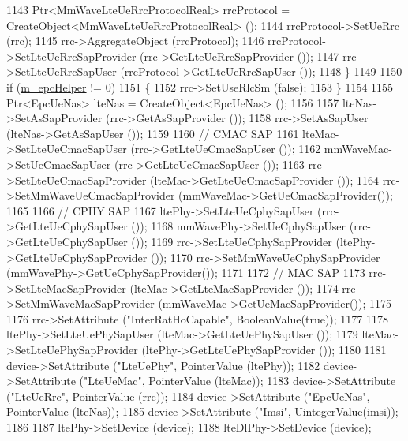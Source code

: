 \begin{DoxyCode}
1143                 Ptr<MmWaveLteUeRrcProtocolReal> rrcProtocol = CreateObject<MmWaveLteUeRrcProtocolReal> ();
1144                 rrcProtocol->SetUeRrc (rrc);
1145                 rrc->AggregateObject (rrcProtocol);
1146                 rrcProtocol->SetLteUeRrcSapProvider (rrc->GetLteUeRrcSapProvider ());
1147                 rrc->SetLteUeRrcSapUser (rrcProtocol->GetLteUeRrcSapUser ());
1148         \}
1149 
1150         \textcolor{keywordflow}{if} (\hyperlink{classns3_1_1MmWaveHelper_a03b33f9a2480a4cdd8ffe697ccc08e9e}{m\_epcHelper} != 0)
1151         \{
1152                 rrc->SetUseRlcSm (\textcolor{keyword}{false});
1153         \}
1154 
1155         Ptr<EpcUeNas> lteNas = CreateObject<EpcUeNas> ();
1156 
1157         lteNas->SetAsSapProvider (rrc->GetAsSapProvider ());
1158         rrc->SetAsSapUser (lteNas->GetAsSapUser ());
1159 
1160         \textcolor{comment}{// CMAC SAP}
1161         lteMac->SetLteUeCmacSapUser (rrc->GetLteUeCmacSapUser ());
1162         mmWaveMac->SetUeCmacSapUser (rrc->GetLteUeCmacSapUser ());
1163         rrc->SetLteUeCmacSapProvider (lteMac->GetLteUeCmacSapProvider ());
1164         rrc->SetMmWaveUeCmacSapProvider (mmWaveMac->GetUeCmacSapProvider());
1165 
1166         \textcolor{comment}{// CPHY SAP}
1167         ltePhy->SetLteUeCphySapUser (rrc->GetLteUeCphySapUser ());
1168         mmWavePhy->SetUeCphySapUser (rrc->GetLteUeCphySapUser ());
1169         rrc->SetLteUeCphySapProvider (ltePhy->GetLteUeCphySapProvider ());
1170         rrc->SetMmWaveUeCphySapProvider (mmWavePhy->GetUeCphySapProvider());
1171 
1172         \textcolor{comment}{// MAC SAP}
1173         rrc->SetLteMacSapProvider (lteMac->GetLteMacSapProvider ());
1174         rrc->SetMmWaveMacSapProvider (mmWaveMac->GetUeMacSapProvider()); 
1175 
1176         rrc->SetAttribute (\textcolor{stringliteral}{"InterRatHoCapable"}, BooleanValue(\textcolor{keyword}{true}));
1177 
1178         ltePhy->SetLteUePhySapUser (lteMac->GetLteUePhySapUser ());
1179         lteMac->SetLteUePhySapProvider (ltePhy->GetLteUePhySapProvider ());
1180 
1181         device->SetAttribute (\textcolor{stringliteral}{"LteUePhy"}, PointerValue (ltePhy));
1182         device->SetAttribute (\textcolor{stringliteral}{"LteUeMac"}, PointerValue (lteMac));
1183         device->SetAttribute (\textcolor{stringliteral}{"LteUeRrc"}, PointerValue (rrc));
1184         device->SetAttribute (\textcolor{stringliteral}{"EpcUeNas"}, PointerValue (lteNas));
1185         device->SetAttribute (\textcolor{stringliteral}{"Imsi"}, UintegerValue(imsi));
1186 
1187         ltePhy->SetDevice (device);
1188         lteDlPhy->SetDevice (device);

\end{DoxyCode}
